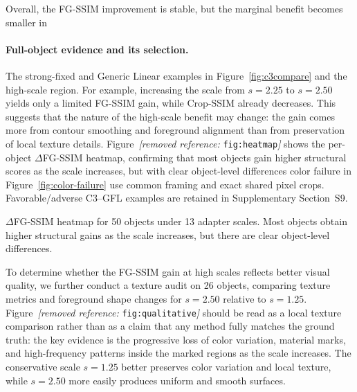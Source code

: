 \documentclass[times,twocolumn,final]{elsarticle}
\providecommand{\DIFadd}[1]{{\protect\color{blue} \sf #1}} %
\providecommand{\DIFdel}[1]{{\protect\color{red} \scriptsize #1}} %
\providecommand{\DIFaddbegin}{} %
\providecommand{\DIFaddend}{} %
\providecommand{\DIFdelbegin}{} %
\providecommand{\DIFdelend}{} %
\providecommand{\DIFdelFL}[1]{\DIFdel{#1}} %
\begin{document}
\DIFdelbegin \DIFdel{Overall, the FG-SSIM improvement is stable, but the marginal benefit becomes smaller in }\DIFdelend \DIFaddbegin \paragraph{Full-object evidence and its selection.}
\DIFadd{The strong-fixed and Generic Linear examples in Figure~\ref{fig:c3compare} and }\DIFaddend the \DIFdelbegin \DIFdel{high-scale region. For example, increasing the scale from $s = 2.25$ to $s = 2.50$ yields only a limited FG-SSIM gain, while Crop-SSIM already decreases. This suggests that the nature of the high-scale benefit may change: the gain comes more from contour smoothing and foreground alignment than from preservation of local texture details. Figure~\textit{[removed reference: }\texttt{fig:heatmap}\textit{]} shows the per-object $\Delta$FG-SSIM heatmap, confirming that most objects gain higher structural scores as the scale increases, but with clear object-level differences}\DIFdelend \DIFaddbegin \DIFadd{color failure in Figure~\ref{fig:color-failure} use common framing and exact shared pixel crops. Favorable/adverse C3--GFL examples are retained in Supplementary Section~S9}\DIFaddend . \DIFdelbegin %

{%
\DIFdelFL{$\Delta$FG-SSIM heatmap for 50 objects under 13 adapter scales. Most objects obtain higher structural gains as the scale increases, but there are clear object-level differences.}}


\DIFdel{To determine whether the FG-SSIM gain at high scales reflects better visual quality, we further conduct a texture audit on 26 objects, comparing texture metrics and foreground shape changes for $s = 2.50$ relative to $s = 1.25$. Figure~\textit{[removed reference: }\texttt{fig:qualitative}\textit{]} should be read as a local texture comparison rather than as a claim that any method fully matches the ground truth: the key evidence is the progressive loss of color variation, material marks, and high-frequency patterns inside the marked regions as the scale increases. The conservative scale $s = 1.25$ better preserves color variation and local texture, while $s = 2.50$ more easily produces uniform and smooth surfaces. }%
\end{document}
